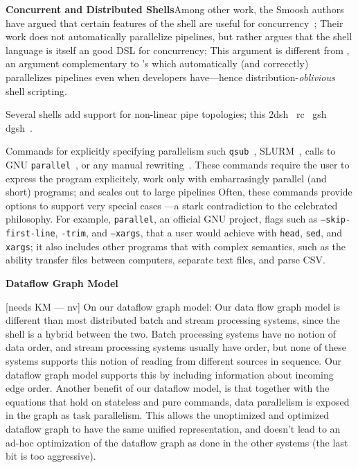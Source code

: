 \documentclass[sigplan,10pt,review,anonymous]{acmart}
\newcommand{\heading}[1]{\vspace{4pt}\noindent\textbf{#1}\enspace}
\newcommand{\ttt}[1]{\texttt{\small #1}}
\newcommand{\tti}[1]{\texttt{\scriptsize #1}}
\newcommand{\nv}[1]{[{\color{cyan}#1 --- nv}]}
\begin{document}
\heading{Concurrent and Distributed Shells}
\nv{NV}
Among other work, the Smoosh authors have argued that certain features of the shell are useful for concurrency~\cite{smoosh:18};
Their work does not automatically parallelize pipelines, but rather argues that the shell language is itself an good DSL for concurrency;
This argument is different from \sys, 
an argument complementary to \sys's which automatically (and correcctly) parallelizes pipelines even when developers have---hence distribution-\emph{oblivious} shell scripting.

Several shells add support for non-linear pipe topologies;
  this 
2dsh~\cite{}
rc~\cite{}
gsh~\cite{}
dgsh~\cite{dagsh:17}.

Commands for explicitly specifying parallelism such \ttt{qsub}~\cite{gentzsch2001sun}, \textsc{SLURM}~\cite{yoo2003slurm}, calls to \textsc{GNU} \ttt{parallel}~\cite{Tange2011a}, or any manual rewriting~\cite{mapreduce:08, ciel:11, spark:12}.
These commands require the user to express the program explicitely, work only with embarrasingly parallel (and short) programs;
  \sys and scales out to large pipelines
Often, these commands provide options to support very special cases
---a stark contradiction to the celebrated \unix philosophy.
For example, \tti{parallel}, an official GNU project, flags such as \ttt{--skip-first-line}, \ttt{-trim}, and \ttt{--xargs}, that a \unix user would achieve with \ttt{head}, \ttt{sed}, and \ttt{xargs}; it also includes other programs that 
with complex semantics, such as the ability transfer files between computers, separate text files, and parse CSV.


\heading{Dataflow Graph Model}

\nv{needs KM}
On our dataflow graph model: Our data flow graph model is
  different than most distributed batch and stream processing systems,
  since the shell is a hybrid between the two. Batch processing
  systems have no notion of data order, and stream processing systems
  usually have order, but none of these systems supports this notion
  of reading from different sources in sequence. Our dataflow graph
  model supports this by including information about incoming edge
  order. Another benefit of our dataflow model, is that together with
  the equations that hold on stateless and pure commands, data
  parallelism is exposed in the graph as task parallelism. This allows
  the unoptimized and optimized dataflow graph to have the same
  unified representation, and doesn't lead to an ad-hoc optimization
  of the dataflow graph as done in the other systems (the last bit is
  too aggressive).
\end{document}
